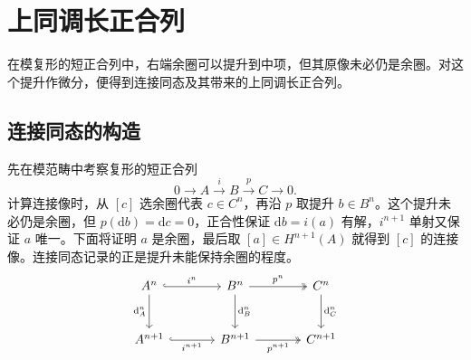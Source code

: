 
\section{上同调长正合列}
\label{b4:sec:0503}

在模复形的短正合列中，右端余圈可以提升到中项，但其原像未必仍是余圈。对这个提升作微分，便得到连接同态及其带来的上同调长正合列。

%
%

\subsection{连接同态的构造}
\label{b4:subsec:0503:01}

先在模范畴中考察复形的短正合列
\[
	0\longrightarrow A\xrightarrow{i}B\xrightarrow{p}C\longrightarrow0.
\]
计算连接像时，从 \([c]\) 选余圈代表 \(c\in C^n\)，再沿 \(p\) 取提升 \(b\in B^n\)。这个提升未必仍是余圈，但 \(p(\mathrm{d}b)=\mathrm{d}c=0\)，正合性保证 \(\mathrm{d}b=i(a)\) 有解，\(i^{n+1}\) 单射又保证 \(a\) 唯一。下面将证明 \(a\) 是余圈，最后取 \([a]\in H^{n+1}(A)\) 就得到 \([c]\) 的连接像。连接同态记录的正是提升未能保持余圈的程度。
\[
	\begin{tikzcd}[column sep=large,row sep=large]
		A^n\arrow[r,hook,"i^n"]\arrow[d,"\mathrm{d}_A^n"']&B^n\arrow[r,two heads,"p^n"]\arrow[d,"\mathrm{d}_B^n"]&C^n\arrow[d,"\mathrm{d}_C^n"]\\
		A^{n+1}\arrow[r,hook,"i^{n+1}"']&B^{n+1}\arrow[r,two heads,"p^{n+1}"']&C^{n+1}
	\end{tikzcd}
\]

